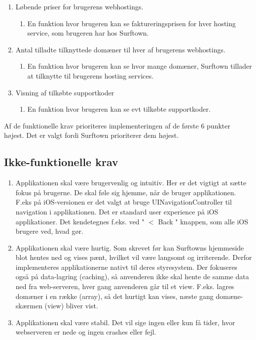 \documentclass[12pt]{article}
\begin{document}
\begin{enumerate}
  \item{Løbende priser for brugerens webhostings.}
	\begin{enumerate}
		\item{En funktion hvor brugeren kan se faktureringsprisen for hver hosting service, som brugeren har hos Surftown.}
	\end{enumerate}
  \item{Antal tilladte tilknyttede domæner til hver af brugerens webhostings.}
	\begin{enumerate}
		\item{En funktion hvor brugeren kan se hvor mange domæner, Surftown tillader at tilknytte til brugerens hosting services.}
	\end{enumerate}
  \item{Visning af tilkøbte supportkoder}
	\begin{enumerate}
		\item{En funktion hvor brugeren kan se evt tilkøbte supportkoder.}
	\end{enumerate}
\end{enumerate}
Af de funktionelle krav prioriteres implementeringen af de første 6 punkter højest. Det er valgt fordi Surftown prioriterer dem højest.
\subsection*{Ikke-funktionelle krav}
\label{nonfunctionlist}
\begin{enumerate}
  \item{Applikationen skal være brugervenlig og intuitiv. Her er det vigtigt at sætte fokus på brugerne. De skal føle sig hjemme,  når de bruger applikationen. F.eks på iOS-versionen er det valgt at bruge UINavigationController til navigation i applikationen. Det er standard user experience på iOS applikationer. Det kendetegnes f.eks. ved " $ < $ Back "  knappen, som alle iOS brugere ved, hvad gør.}
  \item{Applikationen skal være hurtig. Som skrevet før kan Surftowns hjemmeside blot hentes ned og vises pænt, hvilket vil være langsomt og irriterende. Derfor implementeres applikationerne nativt til deres styresystem. Der fokuseres også på data-lagring (caching), så anvenderen ikke skal hente de samme data ned fra web-serveren, hver gang anvenderen går til et view. F.eks. lagres domæner i en række (array), så det hurtigt kan vises, næste gang domæne-skærmen (view)  bliver vist.}
  \item{Applikationen skal være stabil. Det vil sige ingen eller kun få tider, hvor webserveren er nede og ingen crashes eller fejl. }
\end{enumerate}
\end{document}
